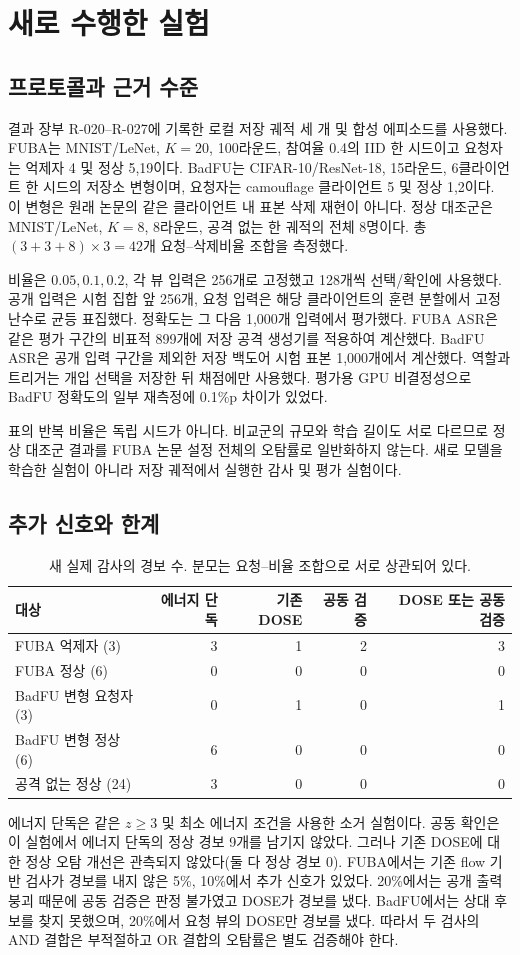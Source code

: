 \documentclass[10pt,a4paper]{article}
\begin{document}
\section{새로 수행한 실험}
\subsection{프로토콜과 근거 수준}
결과 장부 R-020--R-027에 기록한 로컬 저장 궤적 세 개 및 합성 에피소드를 사용했다. FUBA는 MNIST/LeNet, $K=20$, 100라운드,
참여율 0.4의 IID 한 시드이고 요청자는 억제자 4 및 정상 5,19이다.
BadFU는 CIFAR-10/ResNet-18, 15라운드, 6클라이언트 한 시드의 저장소 변형이며,
요청자는 camouflage 클라이언트 5 및 정상 1,2이다.
이 변형은 원래 논문의 같은 클라이언트 내 표본 삭제 재현이 아니다.
정상 대조군은 MNIST/LeNet, $K=8$, 8라운드, 공격 없는 한 궤적의 전체 8명이다.
총 $(3+3+8)\times3=42$개 요청--삭제비율 조합을 측정했다.

비율은 $0.05,0.1,0.2$, 각 뷰 입력은 256개로 고정했고 128개씩 선택/확인에 사용했다.
공개 입력은 시험 집합 앞 256개, 요청 입력은 해당 클라이언트의 훈련 분할에서
고정 난수로 균등 표집했다. 정확도는 그 다음 1,000개 입력에서 평가했다.
FUBA ASR은 같은 평가 구간의 비표적 899개에 저장 공격 생성기를 적용하여 계산했다.
BadFU ASR은 공개 입력 구간을 제외한 저장 백도어 시험 표본 1,000개에서 계산했다.
역할과 트리거는 개입 선택을 저장한 뒤 채점에만 사용했다.
평가용 GPU 비결정성으로 BadFU 정확도의 일부 재측정에 0.1\%p 차이가 있었다.

표의 반복 비율은 독립 시드가 아니다. 비교군의 규모와 학습 길이도 서로 다르므로
정상 대조군 결과를 FUBA 논문 설정 전체의 오탐률로 일반화하지 않는다.
새로 모델을 학습한 실험이 아니라 저장 궤적에서 실행한 감사 및 평가 실험이다.

\subsection{추가 신호와 한계}
\begin{table}[ht]\centering\small
\caption{새 실제 감사의 경보 수. 분모는 요청--비율 조합으로 서로 상관되어 있다.}
\begin{tabular}{lrrrr}\toprule
대상 & 에너지 단독 & 기존 DOSE & 공동 검증 & DOSE 또는 공동 검증\\\midrule
FUBA 억제자 (3) & 3 & 1 & 2 & 3\\
FUBA 정상 (6) & 0 & 0 & 0 & 0\\
BadFU 변형 요청자 (3) & 0 & 1 & 0 & 1\\
BadFU 변형 정상 (6) & 6 & 0 & 0 & 0\\
공격 없는 정상 (24) & 3 & 0 & 0 & 0\\\bottomrule
\end{tabular}
\end{table}
에너지 단독은 같은 $z\ge3$ 및 최소 에너지 조건을 사용한 소거 실험이다.
공동 확인은 이 실험에서 에너지 단독의 정상 경보 9개를 남기지 않았다.
그러나 기존 DOSE에 대한 정상 오탐 개선은 관측되지 않았다(둘 다 정상 경보 0).
FUBA에서는 기존 flow 기반 검사가 경보를 내지 않은 5\%, 10\%에서 추가 신호가 있었다.
20\%에서는 공개 출력 붕괴 때문에 공동 검증은 판정 불가였고 DOSE가 경보를 냈다.
BadFU에서는 상대 후보를 찾지 못했으며, 20\%에서 요청 뷰의 DOSE만 경보를 냈다.
따라서 두 검사의 AND 결합은 부적절하고 OR 결합의 오탐률은 별도 검증해야 한다.
\end{document}
